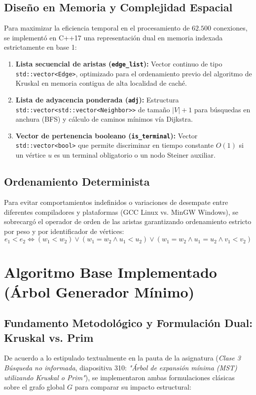 \documentclass[11pt,a4paper]{article}
\begin{document}
\subsection{Diseño en Memoria y Complejidad Espacial}
Para maximizar la eficiencia temporal en el procesamiento de $62.500$ conexiones, se implementó en C++17 una representación dual en memoria indexada estrictamente en base 1:
\begin{enumerate}
    \item \textbf{Lista secuencial de aristas (\texttt{edge\_list}):} Vector continuo de tipo \texttt{std::vector<Edge>}, optimizado para el ordenamiento previo del algoritmo de Kruskal en memoria contigua de alta localidad de caché.
    \item \textbf{Lista de adyacencia ponderada (\texttt{adj}):} Estructura \texttt{std::vector<std::vector<Neighbor>>} de tamaño $|V| + 1$ para búsquedas en anchura (BFS) y cálculo de caminos mínimos vía Dijkstra.
    \item \textbf{Vector de pertenencia booleano (\texttt{is\_terminal}):} Vector \texttt{std::vector<bool>} que permite discriminar en tiempo constante $O(1)$ si un vértice $u$ es un terminal obligatorio o un nodo Steiner auxiliar.
\end{enumerate}

\subsection{Ordenamiento Determinista}
Para evitar comportamientos indefinidos o variaciones de desempate entre diferentes compiladores y plataformas (GCC Linux vs. MinGW Windows), se sobrecargó el operador de orden de las aristas garantizando ordenamiento estricto por peso y por identificador de vértices:
\begin{equation}
    e_1 < e_2 \iff (w_1 < w_2) \lor (w_1 = w_2 \land u_1 < u_2) \lor (w_1 = w_2 \land u_1 = u_2 \land v_1 < v_2)
\end{equation}

\section{Algoritmo Base Implementado (Árbol Generador Mínimo)}
\label{sec:mst}

\subsection{Fundamento Metodológico y Formulación Dual: Kruskal vs. Prim}
De acuerdo a lo estipulado textualmente en la pauta de la asignatura (\textit{Clase 3 Búsqueda no informada}, diapositiva 310: \textit{"Árbol de expansión mínima (MST) utilizando Kruskal o Prim"}), se implementaron ambas formulaciones clásicas sobre el grafo global $G$ para comparar su impacto estructural:
\end{document}

